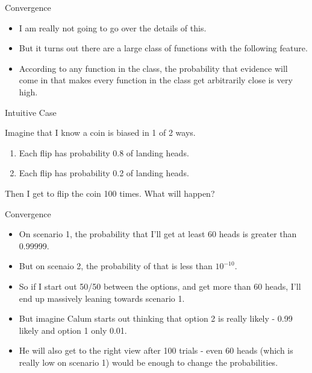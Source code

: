 \documentclass[
  ignorenonframetext,
]{beamer}
\providecommand{\tightlist}{%
  \setlength{\itemsep}{0pt}\setlength{\parskip}{0pt}}
\renewcommand{\,}{\text{, }}
\begin{document}
\begin{frame}{Convergence}
\protect\hypertarget{convergence-1}{}

\begin{itemize}
\tightlist
\item
  I am really not going to go over the details of this.
\item
  But it turns out there are a large class of functions with the
  following feature.
\item
  According to any function in the class, the probability that evidence
  will come in that makes every function in the class get arbitrarily
  close is very high.
\end{itemize}

\end{frame}

\begin{frame}{Intuitive Case}
\protect\hypertarget{intuitive-case}{}

Imagine that I know a coin is biased in 1 of 2 ways.

\begin{enumerate}
\tightlist
\item
  Each flip has probability 0.8 of landing heads.
\item
  Each flip has probability 0.2 of landing heads.
\end{enumerate}

Then I get to flip the coin 100 times. What will happen?

\end{frame}

\begin{frame}{Convergence}
\protect\hypertarget{convergence-2}{}

\begin{itemize}
\tightlist
\item
  On scenario 1, the probability that I'll get at least 60 heads is
  greater than 0.99999.
\item
  But on scenaio 2, the probability of that is less than \(10^{-10}\).
\item
  So if I start out 50/50 between the options, and get more than 60
  heads, I'll end up massively leaning towards scenario 1. \pause
\item
  But imagine Calum starts out thinking that option 2 is really likely -
  0.99 likely and option 1 only 0.01.
\item
  He will also get to the right view after 100 trials - even 60 heads
  (which is really low on scenario 1) would be enough to change the
  probabilities.
\end{itemize}

\end{frame}
\end{document}
